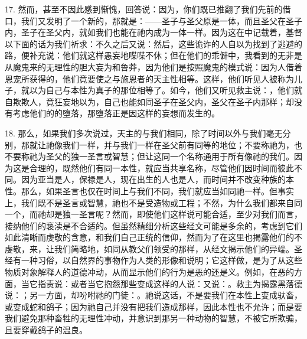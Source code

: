 17. 然而，甚至不因此感到惭愧，回答说：因为，你们既已推翻了我们先前的借口，我们又发明了一个新的，那就是：——圣子与圣父原是一体，而且圣父在圣子内，圣子在圣父内，就如我们也能在祂内成为一体一样。因为这在中记载着，基督以下面的话为我们祈求：不久之后又说：然后，这些诡诈的人自以为找到了逃避的路，便补充说：他们就这样愚妄地喋喋不休；但在他们的乖僻中，我看到的无非是从魔鬼来的无理性的胆大妄为和鲁莽，因为他们是按照魔鬼的模式说：因为人借着恩宠所获得的，他们竟要使之与施恩者的天主性相等。这样，他们听见人被称为儿子，就以为自己与本性为真子的那位相等了。如今，他们又听见救主说：，他们就自欺欺人，竟狂妄地以为，自己也能如同圣子在圣父内，圣父在圣子内那样；却没有考虑他们的的堕落，那堕落正是因这样的妄想而发生的。\par

18. 那么，如果我们多次说过，天主的与我们相同，除了时间以外与我们毫无分别，那就让祂像我们一样，并与我们一样在圣父前有同等的地位；不要称祂为，也不要称祂为圣父的独一圣言或智慧；但让这同一个名称通用于所有像祂的我们。因为这是合理的，既然他们有同一本性，就应当共享名称，尽管他们因时间而彼此不同。因为亚当是人，保禄是人，现在出生的人也是人，而时间并不改变种族的本性。那么，如果圣言也仅在时间上与我们不同，我们就应当如同祂一样。但事实上，我们既不是圣言或智慧，祂也不是受造物或工程；不然，为什么我们都来自同一个，而祂却是独一圣言呢？然而，即使他们这样说可能合适，至少对我们而言，接纳他们的亵渎是不合适的。但虽然精细分析这些经文可能是多余的，考虑到它们如此清晰而虔敬的含意，和我们自己正统的信仰，然而为了在这里也揭露他们的不虔敬，来，让我们简略地，如同从教父们领受的那样，从经文揭示他们的异端。圣经有一种习俗，以自然界的事物作为人类的形像和说明；它这样做，是为了从这些物质对象解释人的道德冲动，从而显示他们的行为是恶的还是义。例如，在恶的方面，当它指责说：或者当它抱怨那些变成这样的人说：又说：。救主为揭露黑落德说：；另一方面，却吩咐祂的门徒：。祂说这话，不是要我们在本性上变成驮畜，或变成蛇和鸽子；因为祂自己并没有把我们造成那样，因此本性也不允许；而是要我们避免那种畜牲的无理性冲动，并意识到那另一种动物的智慧，不被它所欺骗，且要穿戴鸽子的温良。\par

